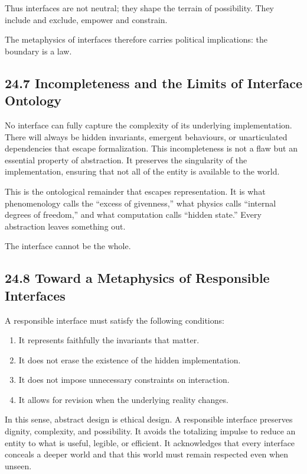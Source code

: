 \documentclass[12pt,letterpaper]{article}
\theoremstyle{remark}
\begin{document}
Thus interfaces are not neutral; they shape the terrain of possibility. They include and exclude, empower and constrain.

The metaphysics of interfaces therefore carries political implications: the boundary is a law.

\subsection{24.7 Incompleteness and the Limits of Interface Ontology}

No interface can fully capture the complexity of its underlying implementation. There will always be hidden invariants, emergent behaviours, or unarticulated dependencies that escape formalization. This incompleteness is not a flaw but an essential property of abstraction. It preserves the singularity of the implementation, ensuring that not all of the entity is available to the world.

This is the ontological remainder that escapes representation. It is what phenomenology calls the ``excess of givenness,'' what physics calls ``internal degrees of freedom,'' and what computation calls ``hidden state.'' Every abstraction leaves something out.

The interface cannot be the whole.

\subsection{24.8 Toward a Metaphysics of Responsible Interfaces}

A responsible interface must satisfy the following conditions:

\begin{enumerate}
    \item It represents faithfully the invariants that matter.
    \item It does not erase the existence of the hidden implementation.
    \item It does not impose unnecessary constraints on interaction.
    \item It allows for revision when the underlying reality changes.
\end{enumerate}

In this sense, abstract design is ethical design. A responsible interface preserves dignity, complexity, and possibility. It avoids the totalizing impulse to reduce an entity to what is useful, legible, or efficient. It acknowledges that every interface conceals a deeper world and that this world must remain respected even when unseen.
\end{document}
